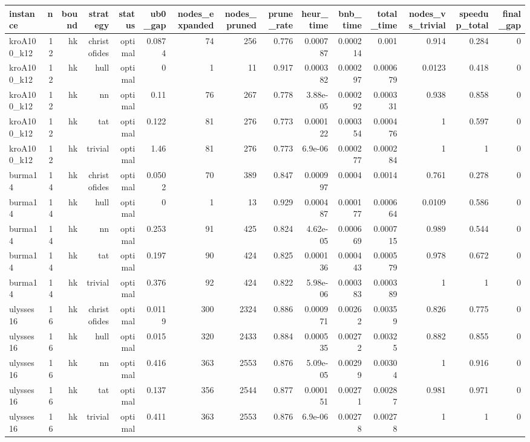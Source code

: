 \begin{tabular}{lrrrrrrrrrrrrrr}
\hline
instance & n & bound & strategy & status & ub0\_gap & nodes\_expanded & nodes\_pruned & prune\_rate & heur\_time & bnb\_time & total\_time & nodes\_vs\_trivial & speedup\_total & final\_gap \\
\hline
kroA100\_k12 & 12 & hk & christofides & optimal & 0.0874 & 74 & 256 & 0.776 & 0.000787 & 0.000214 & 0.001 & 0.914 & 0.284 & 0 \\
kroA100\_k12 & 12 & hk & hull & optimal & 0 & 1 & 11 & 0.917 & 0.000382 & 0.000297 & 0.000679 & 0.0123 & 0.418 & 0 \\
kroA100\_k12 & 12 & hk & nn & optimal & 0.11 & 76 & 267 & 0.778 & 3.88e-05 & 0.000292 & 0.000331 & 0.938 & 0.858 & 0 \\
kroA100\_k12 & 12 & hk & tat & optimal & 0.122 & 81 & 276 & 0.773 & 0.000122 & 0.000354 & 0.000476 & 1 & 0.597 & 0 \\
kroA100\_k12 & 12 & hk & trivial & optimal & 1.46 & 81 & 276 & 0.773 & 6.9e-06 & 0.000277 & 0.000284 & 1 & 1 & 0 \\
burma14 & 14 & hk & christofides & optimal & 0.0502 & 70 & 389 & 0.847 & 0.000997 & 0.0004 & 0.0014 & 0.761 & 0.278 & 0 \\
burma14 & 14 & hk & hull & optimal & 0 & 1 & 13 & 0.929 & 0.000487 & 0.000177 & 0.000664 & 0.0109 & 0.586 & 0 \\
burma14 & 14 & hk & nn & optimal & 0.253 & 91 & 425 & 0.824 & 4.62e-05 & 0.000669 & 0.000715 & 0.989 & 0.544 & 0 \\
burma14 & 14 & hk & tat & optimal & 0.197 & 90 & 424 & 0.825 & 0.000136 & 0.000443 & 0.000579 & 0.978 & 0.672 & 0 \\
burma14 & 14 & hk & trivial & optimal & 0.376 & 92 & 424 & 0.822 & 5.98e-06 & 0.000383 & 0.000389 & 1 & 1 & 0 \\
ulysses16 & 16 & hk & christofides & optimal & 0.0119 & 300 & 2324 & 0.886 & 0.000971 & 0.00262 & 0.00359 & 0.826 & 0.775 & 0 \\
ulysses16 & 16 & hk & hull & optimal & 0.015 & 320 & 2433 & 0.884 & 0.000535 & 0.00272 & 0.00325 & 0.882 & 0.855 & 0 \\
ulysses16 & 16 & hk & nn & optimal & 0.416 & 363 & 2553 & 0.876 & 5.09e-05 & 0.00299 & 0.00304 & 1 & 0.916 & 0 \\
ulysses16 & 16 & hk & tat & optimal & 0.137 & 356 & 2544 & 0.877 & 0.000151 & 0.00271 & 0.00287 & 0.981 & 0.971 & 0 \\
ulysses16 & 16 & hk & trivial & optimal & 0.411 & 363 & 2553 & 0.876 & 6.9e-06 & 0.00278 & 0.00278 & 1 & 1 & 0 \\

\end{tabular}
